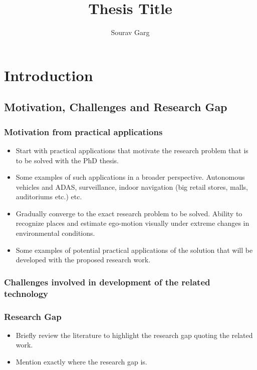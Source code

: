 \documentclass{article}
\title{Thesis Title}
\author{Sourav Garg}
\begin{document}
\maketitle
\tableofcontents


\section{Introduction}

\subsection{Motivation, Challenges and Research Gap}
\subsubsection{Motivation from practical applications}
\begin{itemize}
 \item Start with practical applications that motivate the research problem that is to be solved with the PhD thesis.
 \item Some examples of such applications in a broader perspective.
 \subitem Autonomous vehicles and ADAS, surveillance, indoor navigation (big retail stores, malls, auditoriums etc.) etc.   
 \item Gradually converge to the exact research problem to be solved.
 \subitem Ability to recognize places and estimate ego-motion visually under extreme changes in environmental conditions.
 \item Some examples of potential practical applications of the solution that will be developed with the proposed research work.
\end{itemize}

\subsubsection{Challenges involved in development of the related technology}

\subsubsection{Research Gap}

\begin{itemize}
 \item Briefly review the literature to highlight the research gap quoting the related work.
 \item Mention exactly where the research gap is.
\end{itemize}
\end{document}
